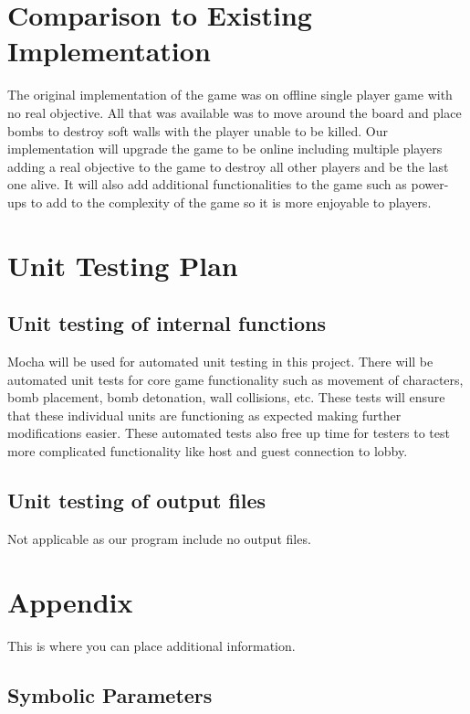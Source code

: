 \documentclass[12pt, titlepage]{article}
\begin{document}
\section{Comparison to Existing Implementation}	
The original implementation of the game was on offline single player game with no real objective. All that was available was to move around the board and place bombs to destroy soft walls with the player unable to be killed. Our implementation will upgrade the game to be online including multiple players adding a real objective to the game to destroy all other players and be the last one alive. It will also add additional functionalities to the game such as power-ups to add to the complexity of the game so it is more enjoyable to players.

\section{Unit Testing Plan}

\subsection{Unit testing of internal functions}

Mocha will be used for automated unit testing in this project. There will be automated unit tests for core game functionality such as movement of characters, bomb placement, bomb detonation, wall collisions, etc. These tests will ensure that these individual units are functioning as expected making further modifications easier. These automated tests also free up time for testers to test more complicated functionality like host and guest connection to lobby.

\subsection{Unit testing of output files}
Not applicable as our program include no output files.





\newpage

\section{Appendix}

This is where you can place additional information.

\subsection{Symbolic Parameters}
\end{document}
